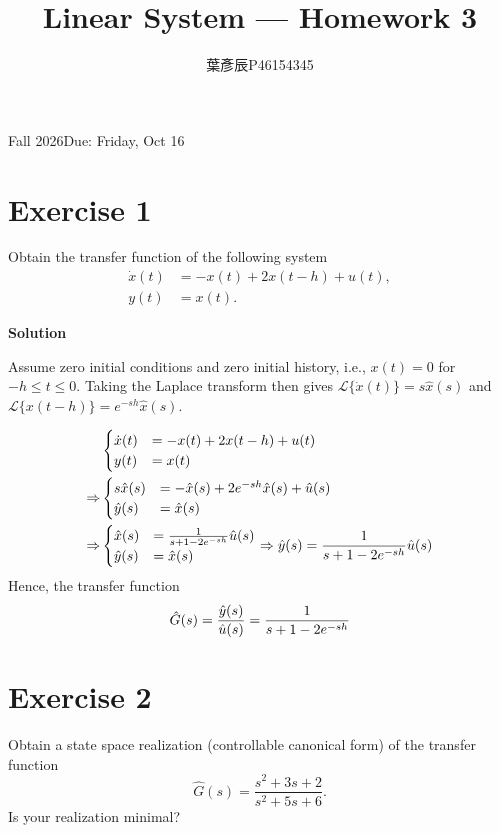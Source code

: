 \documentclass[12pt,a4paper]{article}
\title{Linear System --- Homework 3}
\author{葉彥辰\quad P46154345}
\date{}
\begin{document}
\maketitle
\begin{center}Fall 2026\quad Due: Friday, Oct 16\end{center}

\section*{Exercise 1}
Obtain the transfer function of the following system
\[
\begin{aligned}
\dot x(t) &= -x(t)+2x(t-h)+u(t),\\
y(t) &= x(t).
\end{aligned}
\]

\textbf{Solution}

Assume zero initial conditions and zero initial history, i.e.,
$x(t)=0$ for $-h\leq t\leq 0$. Taking the Laplace transform then gives
$\mathcal{L}\{\dot x(t)\}=s\hat x(s)$ and
$\mathcal{L}\{x(t-h)\}=e^{-sh}\hat x(s)$.

\begin{align*}
	&\begin{cases}
		\dot x(t) &= -x(t) + 2x(t - h) + u(t) \\
		y(t) &= x(t)
	\end{cases} \\
	\Rightarrow &\begin{cases}
		s\hat x(s) &= -\hat x(s) +2 e^{-sh} \hat x(s) + \hat u(s) \\
		\hat y(s) &= \hat x(s)
	\end{cases} \\
	\Rightarrow &\begin{cases}
		\hat x(s) &= {1\over s + 1 -2 e^{-sh} } \hat u(s) \\
		\hat y(s) &= \hat x(s) 
	\end{cases}
	\Rightarrow \hat y(s) =  {1\over s + 1 -2 e^{-sh} } \hat u(s) \\
\end{align*}
Hence, the transfer function
\[
\hat G(s) = {\hat y(s) \over \hat u(s)} = {1\over s + 1 - 2e^{-sh}}
\]

\newpage
\section*{Exercise 2}
Obtain a state space realization (controllable canonical form) of the transfer
function
\[
\hat G(s)=\frac{s^2+3s+2}{s^2+5s+6}.
\]
Is your realization minimal?
\end{document}
